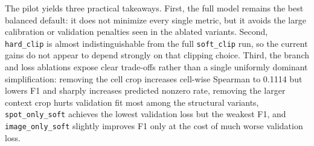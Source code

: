 \documentclass[sigconf,review]{acmart}
\begin{document}
\begin{table}[t]
\centering
\scriptsize
\setlength{\tabcolsep}{4pt}
\caption{STBoost pilot ablations on the A$\to$A protocol. All variants use $n_{\mathrm{train/ref}}=4096$ and $n_{\mathrm{test}}=2000$ under a matched pilot-scale evaluation budget, with identical preprocessing, split construction, target genes, and metrics.}
\label{tab:STBoost_k2k_ablation}
\end{table}

The pilot yields three practical takeaways. First, the full model remains the best balanced default: it does not minimize every single metric, but it avoids the large calibration or validation penalties seen in the ablated variants. Second, \texttt{hard\_clip} is almost indistinguishable from the full \texttt{soft\_clip} run, so the current gains do not appear to depend strongly on that clipping choice. Third, the branch and loss ablations expose clear trade-offs rather than a single uniformly dominant simplification: removing the cell crop increases cell-wise Spearman to 0.1114 but lowers F1 and sharply increases predicted nonzero rate, removing the larger context crop hurts validation fit most among the structural variants, \texttt{spot\_only\_soft} achieves the lowest validation loss but the weakest F1, and \texttt{image\_only\_soft} slightly improves F1 only at the cost of much worse validation loss.
\end{document}
